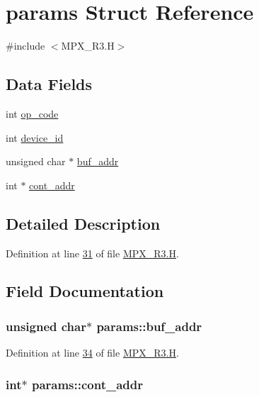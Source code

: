 \hypertarget{structparams}{
\section{params Struct Reference}
\label{structparams}
}


{\ttfamily \#include $<$MPX\_\-R3.H$>$}

\subsection*{Data Fields}
\begin{DoxyCompactItemize}
\item 
int \hyperlink{structparams_a6241c070629ecc889aeaebd1665d2950}{op\_\-code}
\item 
int \hyperlink{structparams_a85b8d139fb9b97b59b21b4fca0afcf07}{device\_\-id}
\item 
unsigned char $\ast$ \hyperlink{structparams_a0eff67154314736e9b186ae54c9749e2}{buf\_\-addr}
\item 
int $\ast$ \hyperlink{structparams_a6b66484b500caf1b1aaba794d77a7102}{cont\_\-addr}
\end{DoxyCompactItemize}


\subsection{Detailed Description}


Definition at line \hyperlink{_m_p_x___r3_8_h_source_l00031}{31} of file \hyperlink{_m_p_x___r3_8_h_source}{MPX\_\-R3.H}.



\subsection{Field Documentation}
\hypertarget{structparams_a0eff67154314736e9b186ae54c9749e2}{
\subsubsection[{buf\_\-addr}]{\setlength{\rightskip}{0pt plus 5cm}unsigned char$\ast$ {\bf params::buf\_\-addr}}}
\label{structparams_a0eff67154314736e9b186ae54c9749e2}


Definition at line \hyperlink{_m_p_x___r3_8_h_source_l00034}{34} of file \hyperlink{_m_p_x___r3_8_h_source}{MPX\_\-R3.H}.

\hypertarget{structparams_a6b66484b500caf1b1aaba794d77a7102}{
\subsubsection[{cont\_\-addr}]{\setlength{\rightskip}{0pt plus 5cm}int$\ast$ {\bf params::cont\_\-addr}}}
\label{structparams_a6b66484b500caf1b1aaba794d77a7102}


